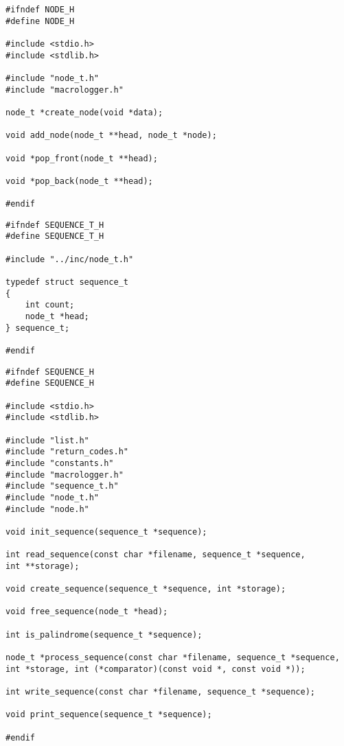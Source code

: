 \clearpage

\begin{center}
    \captionsetup{justification=raggedright,singlelinecheck=off}
    \begin{lstlisting}[label=lst:node,caption=node.h]
#ifndef NODE_H
#define NODE_H

#include <stdio.h>
#include <stdlib.h>

#include "node_t.h"
#include "macrologger.h"

node_t *create_node(void *data);

void add_node(node_t **head, node_t *node);

void *pop_front(node_t **head);

void *pop_back(node_t **head);

#endif
\end{lstlisting}
\end{center}

\begin{center}
    \captionsetup{justification=raggedright,singlelinecheck=off}
    \begin{lstlisting}[label=lst:sequencet,caption=sequence\_t.h]
#ifndef SEQUENCE_T_H
#define SEQUENCE_T_H

#include "../inc/node_t.h"

typedef struct sequence_t
{
    int count;
    node_t *head;
} sequence_t;

#endif
\end{lstlisting}
\end{center}

\clearpage

\begin{center}
    \captionsetup{justification=raggedright,singlelinecheck=off}
    \begin{lstlisting}[label=lst:sequence,caption=sequence.h]
#ifndef SEQUENCE_H
#define SEQUENCE_H

#include <stdio.h>
#include <stdlib.h>

#include "list.h"
#include "return_codes.h"
#include "constants.h"
#include "macrologger.h"
#include "sequence_t.h"
#include "node_t.h"
#include "node.h"

void init_sequence(sequence_t *sequence);

int read_sequence(const char *filename, sequence_t *sequence,
int **storage);

void create_sequence(sequence_t *sequence, int *storage);

void free_sequence(node_t *head);

int is_palindrome(sequence_t *sequence);

node_t *process_sequence(const char *filename, sequence_t *sequence,
int *storage, int (*comparator)(const void *, const void *));

int write_sequence(const char *filename, sequence_t *sequence);

void print_sequence(sequence_t *sequence);

#endif
\end{lstlisting}
\end{center}


